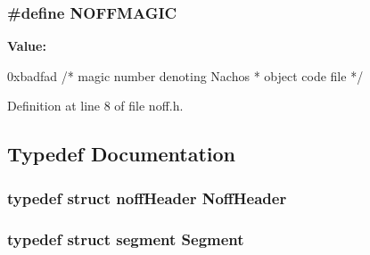 \subsubsection[{N\+O\+F\+F\+M\+A\+G\+IC}]{\setlength{\rightskip}{0pt plus 5cm}\#define N\+O\+F\+F\+M\+A\+G\+IC}\label{noff_8h_a68f6a444876f7e3ac6cb10b0ac72fcc9}
{\bfseries Value\+:}
\begin{DoxyCode}
0xbadfad    \textcolor{comment}{/* magic number denoting Nachos }
\textcolor{comment}{                     * object code file }
\textcolor{comment}{                     */}
\end{DoxyCode}


Definition at line 8 of file noff.\+h.



\subsection{Typedef Documentation}
\subsubsection[{Noff\+Header}]{\setlength{\rightskip}{0pt plus 5cm}typedef struct {\bf noff\+Header}  {\bf Noff\+Header}}\label{noff_8h_af3befd7cb80b1293ec9fdbc26eec3e71}
\subsubsection[{Segment}]{\setlength{\rightskip}{0pt plus 5cm}typedef struct {\bf segment}  {\bf Segment}}\label{noff_8h_a6ae97e426a82aa010ddf8069e21123f9}
